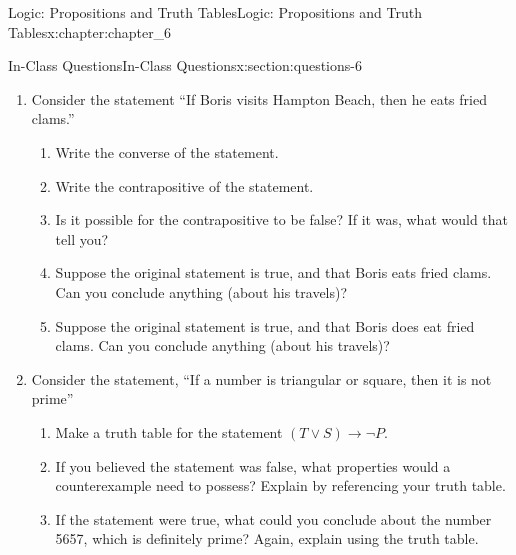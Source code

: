 \documentclass[oneside,10pt,]{book}
\numberwithin{equation}{section}
\begin{document}
\begin{chapterptx}{Logic: Propositions and Truth Tables}{}{Logic: Propositions and Truth Tables}{}{}{x:chapter:chapter_6}
\begin{sectionptx}{In-Class Questions}{}{In-Class Questions}{}{}{x:section:questions-6}
\begin{enumerate}[label=\arabic*.]
\item{}Consider the statement “If Boris visits Hampton Beach, then he eats fried clams.”%
\begin{enumerate}[label=(\alph*)]
\item{}Write the converse of the statement.%
\item{}Write the contrapositive of the statement.%
\item{}Is it possible for the contrapositive to be false? If it was, what would that tell you?%
\item{}Suppose the original statement is true, and that Boris eats fried clams. Can you conclude anything (about his travels)?%
\item{}Suppose the original statement is true, and that Boris does eat fried clams. Can you conclude anything (about his travels)?%
\end{enumerate}
%
\item{}Consider the statement, ``If a number is triangular or square, then it is not prime''%
\begin{enumerate}[label=(\alph*)]
\item{}Make a truth table for the statement \((T \vee S) \rightarrow \neg P\).%
\item{}If you believed the statement was false, what properties would a counterexample need to possess? Explain by referencing your truth table.%
\item{}If the statement were true, what could you conclude about the number 5657, which is definitely prime? Again, explain using the truth table.%
\end{enumerate}
%
\end{enumerate}
%
\end{sectionptx}
\end{chapterptx}
%
%
\typeout{************************************************}
\typeout{************************************************}
%
\end{document}
